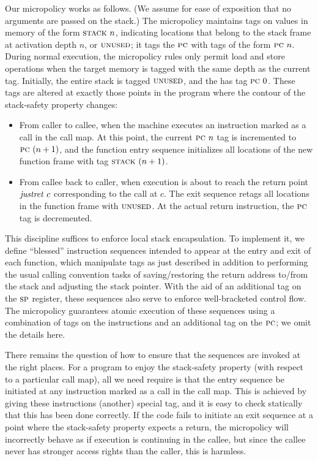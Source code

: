 \documentclass[acmsmall,review,anonymous]{acmart}\settopmatter{printfolios=true,printccs=false,printacmref=false}
\begin{document}
{Our micropolicy works as follows. (We assume for ease of exposition that no
arguments are passed on the stack.)
The micropolicy maintains tags on values in memory of the form $\textsc{stack} ~ n$,
indicating locations that belong to the stack frame at activation depth $n$,
or $\textsc{unused}$; it tags the $\textsc{pc}$ with tags of the form $\textsc{pc} ~ n$.
During normal execution, the micropolicy rules only permit load and store operations
when the target memory is tagged with the same depth as the current {\PCname} tag.
Initially, the entire stack is tagged $\textsc{unused}$,
and the {\PCname} has tag $\textsc{pc} ~ 0$. These tags are altered
at exactly those points in
the program where the contour of the stack-safety property changes:

\begin{itemize}

\item From caller to callee, when the machine executes an instruction marked as a call in
  the call map.
  At this point, the current
  $\textsc{pc} ~ n$ tag is incremented to $\textsc{pc} ~ (n + 1)$, and the function
  entry sequence initializes  all locations of the new function frame with
  tag $\textsc{stack} ~ (n + 1)$.

\item From callee back to caller, when execution is about to reach the return point
  $\mathit{justret}\ c$
  corresponding to the call at $c$.  The exit sequence retags all locations in the function
  frame with $\textsc{unused}$. At the actual return instruction, the
  $\textsc{pc}$ tag is decremented.

\end{itemize}

This discipline suffices to enforce local stack encapsulation.
To implement it,  we define ``blessed'' instruction sequences
intended to appear at the entry and exit of each function,
which manipulate tags as just described in addition to performing the
usual calling convention tasks of saving/restoring the return address to/from
the stack and adjusting the stack pointer. With the aid of an additional tag on
the $\textsc{sp}$ register, these sequences also serve to enforce
well-bracketed control flow.
The micropolicy guarantees atomic execution of these sequences
using a combination of tags on the instructions
and an additional tag on the $\textsc{pc}$; we omit the details here.

There remains the question of how to ensure that the sequences are
invoked at the right places. For a program to enjoy the stack-safety property
(with respect to a particular call map), all we need require is that
the entry sequence be initiated at any instruction marked as a call
in the call map. This is achieved by giving these instructions (another) special tag,
and it is easy to check statically that this has been done correctly.
If the code fails to initiate an exit
sequence at a point where the stack-safety property expects a return,
the micropolicy will incorrectly behave as if execution
is continuing in the callee, but since the callee never has stronger access
rights than the caller, this is harmless.

}
\end{document}

